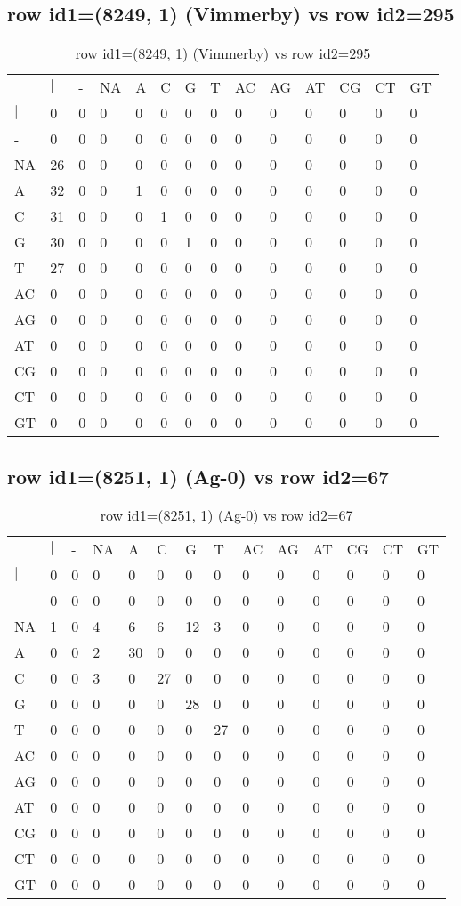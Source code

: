\subsection{row id1=(8249, 1) (Vimmerby) vs row id2=295}
\begin{center}
\begin{longtable}{|l|l|l|l|l|l|l|l|l|l|l|l|l|l|}
\caption{row id1=(8249, 1) (Vimmerby) vs row id2=295} \label{table_dm194}\\
\hline
\\
\hline
&$|$&-&NA&A&C&G&T&AC&AG&AT&CG&CT&GT\\
$|$&0&0&0&0&0&0&0&0&0&0&0&0&0\\
-&0&0&0&0&0&0&0&0&0&0&0&0&0\\
NA&26&0&0&0&0&0&0&0&0&0&0&0&0\\
A&32&0&0&1&0&0&0&0&0&0&0&0&0\\
C&31&0&0&0&1&0&0&0&0&0&0&0&0\\
G&30&0&0&0&0&1&0&0&0&0&0&0&0\\
T&27&0&0&0&0&0&0&0&0&0&0&0&0\\
AC&0&0&0&0&0&0&0&0&0&0&0&0&0\\
AG&0&0&0&0&0&0&0&0&0&0&0&0&0\\
AT&0&0&0&0&0&0&0&0&0&0&0&0&0\\
CG&0&0&0&0&0&0&0&0&0&0&0&0&0\\
CT&0&0&0&0&0&0&0&0&0&0&0&0&0\\
GT&0&0&0&0&0&0&0&0&0&0&0&0&0\\
\hline
\end{longtable}
\end{center}

\subsection{row id1=(8251, 1) (Ag-0) vs row id2=67}
\begin{center}
\begin{longtable}{|l|l|l|l|l|l|l|l|l|l|l|l|l|l|}
\caption{row id1=(8251, 1) (Ag-0) vs row id2=67} \label{table_dm196}\\
\hline
\\
\hline
&$|$&-&NA&A&C&G&T&AC&AG&AT&CG&CT&GT\\
$|$&0&0&0&0&0&0&0&0&0&0&0&0&0\\
-&0&0&0&0&0&0&0&0&0&0&0&0&0\\
NA&1&0&4&6&6&12&3&0&0&0&0&0&0\\
A&0&0&2&30&0&0&0&0&0&0&0&0&0\\
C&0&0&3&0&27&0&0&0&0&0&0&0&0\\
G&0&0&0&0&0&28&0&0&0&0&0&0&0\\
T&0&0&0&0&0&0&27&0&0&0&0&0&0\\
AC&0&0&0&0&0&0&0&0&0&0&0&0&0\\
AG&0&0&0&0&0&0&0&0&0&0&0&0&0\\
AT&0&0&0&0&0&0&0&0&0&0&0&0&0\\
CG&0&0&0&0&0&0&0&0&0&0&0&0&0\\
CT&0&0&0&0&0&0&0&0&0&0&0&0&0\\
GT&0&0&0&0&0&0&0&0&0&0&0&0&0\\
\hline
\end{longtable}
\end{center}

